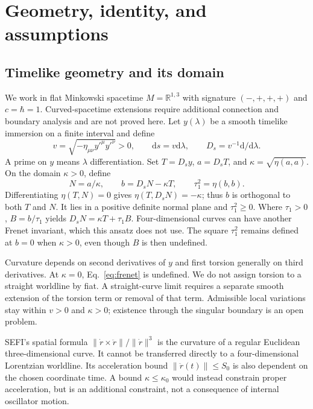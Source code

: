 \documentclass[aip,jmp,reprint,onecolumn,amsmath,amssymb]{revtex4-2}
\newcommand{\dd}{\mathrm{d}}
\newcommand{\Ds}{D_s}
\begin{document}
\section{Geometry, identity, and assumptions}
\subsection{Timelike geometry and its domain}
We work in flat Minkowski spacetime $M=\mathbb R^{1,3}$ with signature $(-,+,+,+)$ and $c=\hbar=1$. Curved-spacetime extensions require additional connection and boundary analysis and are not proved here. Let $y(\lambda)$ be a smooth timelike immersion on a finite interval and define
\begin{equation}
 v=\sqrt{-\eta_{\mu\nu}y'^{\mu}y'^{\nu}}>0,
 \qquad \dd s=v\dd\lambda,\qquad
 \Ds=v^{-1}\dd/\dd\lambda .
 \label{eq:proper}
\end{equation}
A prime on $y$ means $\lambda$ differentiation. Set $T=\Ds y$, $a=\Ds T$, and $\kappa=\sqrt{\eta(a,a)}$. On the domain $\kappa>0$, define
\begin{equation}
 N=a/\kappa,\qquad b=\Ds N-\kappa T,
 \qquad \tau_1^2=\eta(b,b).
 \label{eq:frenet}
\end{equation}
Differentiating $\eta(T,N)=0$ gives $\eta(T,\Ds N)=-\kappa$; thus $b$ is orthogonal to both $T$ and $N$. It lies in a positive definite normal plane and $\tau_1^2\geq0$. Where $\tau_1>0$, $B=b/\tau_1$ yields $\Ds N=\kappa T+\tau_1B$. Four-dimensional curves can have another Frenet invariant, which this ansatz does not use. The square $\tau_1^2$ remains defined at $b=0$ when $\kappa>0$, even though $B$ is then undefined.

Curvature depends on second derivatives of $y$ and first torsion generally on third derivatives. At $\kappa=0$, Eq.~\eqref{eq:frenet} is undefined. We do not assign torsion to a straight worldline by fiat. A straight-curve limit requires a separate smooth extension of the torsion term or removal of that term. Admissible local variations stay within $v>0$ and $\kappa>0$; existence through the singular boundary is an open problem.

SEFI's spatial formula $\|\dot r\times\ddot r\|/\|\dot r\|^3$ is the curvature of a regular Euclidean three-dimensional curve. It cannot be transferred directly to a four-dimensional Lorentzian worldline. Its acceleration bound $\|\ddot r(t)\|\leq S_0$ is also dependent on the chosen coordinate time. A bound $\kappa\leq\kappa_0$ would instead constrain proper acceleration, but is an additional constraint, not a consequence of internal oscillator motion.
\end{document}
